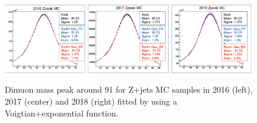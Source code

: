 \begin{figure}[h!]
    \centering
    \includegraphics[width=0.32\textwidth]{images_geofit/DY_MC_mass_geofit_2016.png}
    \includegraphics[width=0.32\textwidth]{images_geofit/DY_MC_mass_geofit_2017.png}
    \includegraphics[width=0.32\textwidth]{images_geofit/DY_MC_mass_geofit_2018.png}
    \caption{Dimuon mass peak around 91 \gev for Z+jets MC samples in 2016 (left), 2017 (center) and 2018 (right) fitted by using a Voigtian+exponential function.}
    \label{fig:dimu_mass_DY_MC}
\end{figure}

